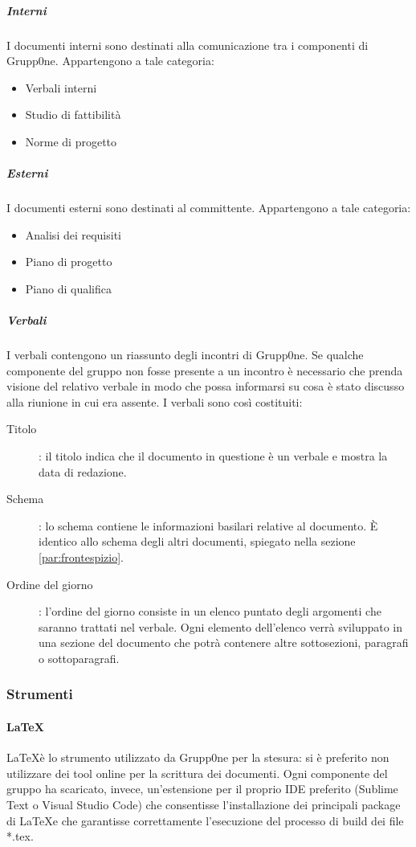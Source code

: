 \documentclass[../norme-di-progetto.tex]{subfiles}
\begin{document}
\subparagraph{Interni}%
\label{subp:suddivisione dei documenti/interni}
 I documenti interni sono destinati alla comunicazione tra i componenti di Grupp0ne. Appartengono a tale categoria:

\begin{itemize}
  \item Verbali interni
  \item Studio di fattibilità
  \item Norme di progetto
\end{itemize}

\subparagraph{Esterni}%
\label{subp:suddivisione dei documenti/esterni}
I documenti esterni sono destinati al committente. Appartengono a tale categoria:

\begin{itemize}
  \item Analisi dei requisiti
  \item Piano di progetto
  \item Piano di qualifica
\end{itemize}

\subparagraph{Verbali}%
\label{subp:verbali}
I verbali contengono un riassunto degli incontri di Grupp0ne. Se qualche componente del gruppo non fosse presente a un incontro è necessario che prenda visione del relativo verbale in modo che possa informarsi su cosa è stato discusso alla riunione in cui era assente. I verbali sono così costituiti:
\begin{description}
  \item [Titolo]: il titolo indica che il documento in questione è un verbale e mostra la data di redazione.
  \item [Schema]: lo schema contiene le informazioni basilari relative al documento. È identico allo schema degli altri documenti, spiegato nella sezione \ref{par:frontespizio}.
  \item [Ordine del giorno]: l'ordine del giorno consiste in un elenco puntato degli argomenti che saranno trattati nel verbale. Ogni elemento dell'elenco verrà sviluppato in una sezione del documento che potrà contenere altre sottosezioni, paragrafi o sottoparagrafi.
\end{description}

\subsubsection{Strumenti}

\paragraph {\LaTeX}%
\label{par:LaTeX}
\LaTeX è lo strumento utilizzato da Grupp0ne per la stesura: si è preferito non utilizzare dei tool online per la scrittura dei documenti.
Ogni componente del gruppo ha scaricato, invece, un'estensione per il proprio IDE preferito (Sublime Text o Visual Studio Code) che consentisse l'installazione dei principali package di \LaTeX e che garantisse correttamente l'esecuzione del processo di build dei file *.tex.
\end{document}
